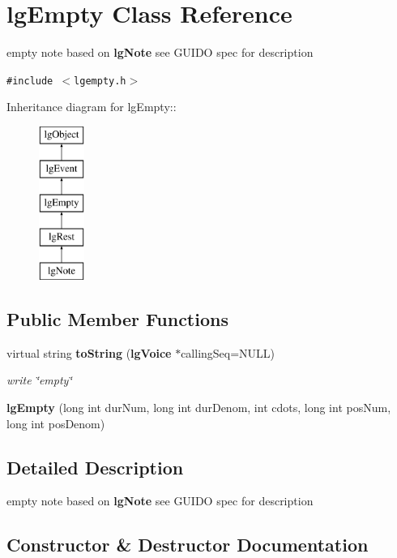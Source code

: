 \section{lg\-Empty Class Reference}
\label{classlgEmpty}
empty note based on {\bf lg\-Note} see GUIDO spec for description  


{\tt \#include $<$lgempty.h$>$}

Inheritance diagram for lg\-Empty::\begin{figure}[H]
\begin{center}
\leavevmode
\includegraphics[height=5cm]{classlgEmpty}
\end{center}
\end{figure}
\subsection*{Public Member Functions}
\begin{CompactItemize}
\item 
virtual string {\bf to\-String} ({\bf lg\-Voice} $\ast$calling\-Seq=NULL)
\begin{CompactList}\small\item\em write \char`\"{}empty\char`\"{} \item\end{CompactList}\item 
{\bf lg\-Empty} (long int dur\-Num, long int dur\-Denom, int cdots, long int pos\-Num, long int pos\-Denom)
\end{CompactItemize}


\subsection{Detailed Description}
empty note based on {\bf lg\-Note} see GUIDO spec for description 



\subsection{Constructor \& Destructor Documentation}
